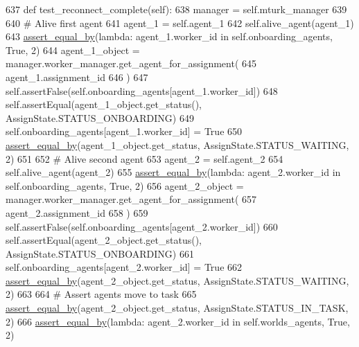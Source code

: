 \begin{DoxyCode}
637     \textcolor{keyword}{def }test\_reconnect\_complete(self):
638         manager = self.mturk\_manager
639 
640         \textcolor{comment}{# Alive first agent}
641         agent\_1 = self.agent\_1
642         self.alive\_agent(agent\_1)
643         \hyperlink{namespaceparlai_1_1mturk_1_1core_1_1test_1_1test__full__system_a0b463246d35658a2e422010f13dcf819}{assert\_equal\_by}(\textcolor{keyword}{lambda}: agent\_1.worker\_id \textcolor{keywordflow}{in} self.onboarding\_agents, \textcolor{keyword}{True}, 2)
644         agent\_1\_object = manager.worker\_manager.get\_agent\_for\_assignment(
645             agent\_1.assignment\_id
646         )
647         self.assertFalse(self.onboarding\_agents[agent\_1.worker\_id])
648         self.assertEqual(agent\_1\_object.get\_status(), AssignState.STATUS\_ONBOARDING)
649         self.onboarding\_agents[agent\_1.worker\_id] = \textcolor{keyword}{True}
650         \hyperlink{namespaceparlai_1_1mturk_1_1core_1_1test_1_1test__full__system_a0b463246d35658a2e422010f13dcf819}{assert\_equal\_by}(agent\_1\_object.get\_status, AssignState.STATUS\_WAITING, 2)
651 
652         \textcolor{comment}{# Alive second agent}
653         agent\_2 = self.agent\_2
654         self.alive\_agent(agent\_2)
655         \hyperlink{namespaceparlai_1_1mturk_1_1core_1_1test_1_1test__full__system_a0b463246d35658a2e422010f13dcf819}{assert\_equal\_by}(\textcolor{keyword}{lambda}: agent\_2.worker\_id \textcolor{keywordflow}{in} self.onboarding\_agents, \textcolor{keyword}{True}, 2)
656         agent\_2\_object = manager.worker\_manager.get\_agent\_for\_assignment(
657             agent\_2.assignment\_id
658         )
659         self.assertFalse(self.onboarding\_agents[agent\_2.worker\_id])
660         self.assertEqual(agent\_2\_object.get\_status(), AssignState.STATUS\_ONBOARDING)
661         self.onboarding\_agents[agent\_2.worker\_id] = \textcolor{keyword}{True}
662         \hyperlink{namespaceparlai_1_1mturk_1_1core_1_1test_1_1test__full__system_a0b463246d35658a2e422010f13dcf819}{assert\_equal\_by}(agent\_2\_object.get\_status, AssignState.STATUS\_WAITING, 2)
663 
664         \textcolor{comment}{# Assert agents move to task}
665         \hyperlink{namespaceparlai_1_1mturk_1_1core_1_1test_1_1test__full__system_a0b463246d35658a2e422010f13dcf819}{assert\_equal\_by}(agent\_2\_object.get\_status, AssignState.STATUS\_IN\_TASK, 2)
666         \hyperlink{namespaceparlai_1_1mturk_1_1core_1_1test_1_1test__full__system_a0b463246d35658a2e422010f13dcf819}{assert\_equal\_by}(\textcolor{keyword}{lambda}: agent\_2.worker\_id \textcolor{keywordflow}{in} self.worlds\_agents, \textcolor{keyword}{True}, 2)

\end{DoxyCode}
